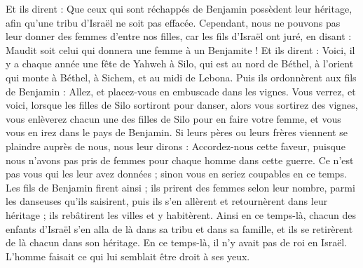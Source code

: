 \begin{multicols}{2}
Et ils dirent : Que ceux qui sont réchappés de Benjamin possèdent leur héritage, afin qu'une tribu d'Israël ne soit pas effacée.
Cependant, nous ne pouvons pas leur donner des femmes d'entre nos filles, car les fils d'Israël ont juré, en disant : Maudit soit celui qui donnera une femme à un Benjamite !
Et ils dirent : Voici, il y a chaque année une fête de Yahweh à Silo, qui est au nord de Béthel, à l'orient qui monte à Béthel, à Sichem, et au midi de Lebona.
Puis ils ordonnèrent aux fils de Benjamin : Allez, et placez-vous en embuscade dans les vignes.
Vous verrez, et voici, lorsque les filles de Silo sortiront pour danser, alors vous sortirez des vignes, vous enlèverez chacun une des filles de Silo pour en faire votre femme, et vous vous en irez dans le pays de Benjamin.
Si leurs pères ou leurs frères viennent se plaindre auprès de nous, nous leur dirons : Accordez-nous cette faveur, puisque nous n'avons pas pris de femmes pour chaque homme dans cette guerre. Ce n'est pas vous qui les leur avez données ; sinon vous en seriez coupables en ce temps.
Les fils de Benjamin firent ainsi ; ils prirent des femmes selon leur nombre, parmi les danseuses qu'ils saisirent, puis ils s'en allèrent et retournèrent dans leur héritage ; ils rebâtirent les villes et y habitèrent.
Ainsi en ce temps-là, chacun des enfants d'Israël s'en alla de là dans sa tribu et dans sa famille, et ils se retirèrent de là chacun dans son héritage.
En ce temps-là, il n'y avait pas de roi en Israël. L'homme faisait ce qui lui semblait être droit à ses yeux.
\PPE{}
\end{multicols}
